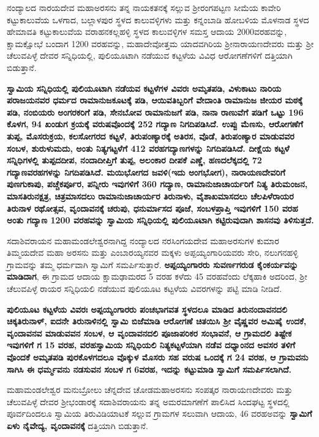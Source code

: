 ನಂದ್ಯಾಲದ ನಾರಯದೇವ ಮಹಾಅರಸನು ತನ್ನ ನಾಯಕತನಕ್ಕೆ ಸಲ್ಲುವ ಶ‍್ರೀರಂಗಪಟ್ಟಣ ಸೀಮೆಯ ಕಾವೇರಿ ಕಟ್ಟುಕಾಲುವೆಯ ಒಳಗಾದ, ಬಲ್ಲಾಳಪುರ ಸ್ಥಳದ ಕಾಲುವಳ್ಳಿಗಳು ಮತ್ತು ಕನ್ನಂಬಾಡಿ ಹೋಬಳಿಯ ಮೊಳನಾಡ ಸ್ಥಳದ ಹೇಮಾವತಿ ಕಟ್ಟುಕಾಲುವೆಯ ವರಾಹನಕಲ್ಲಹಳ್ಳಿ ಸ್ಥಳದ ಕಾಲುವಳ್ಳಿಗಳ ಸಮಸ್ತ ಆದಾಯ 2000ವರಹವನ್ನು, ಕ್ಷಾಮಕ್ಷೋಭೆ ಬಂದಾಗ 1200 ವರಹವನ್ನು, ಮಹಾದೇವೋತ್ತಮ ಯಾದವಗಿರಿಯ ಶ‍್ರೀನಾರಾಯಣದೇವರು ಮತ್ತು ಶ‍್ರೀ ಚೆಲುವಪಿಳ್ಳೆ ದೇವರ ಸನ್ನಿಧಿಯಲ್ಲಿ, ಪುಲಿಯೂಟಾಗಿ ನಡೆಯುವ ಕಟ್ಟಳೆಯ ವಿವಿಧ ಆರೋಗಣೆಗಳಿಗೆ ದತ್ತಿಯಾಗಿ ಬಿಡುತ್ತಾನೆ.

\textbf{ಸ್ವಾಮಿಯ ಸನ್ನಿಧಿಯಲ್ಲಿ ಪುಲಿಯೂಟಾಗಿ ನಡೆಯವ ಕಟ್ಟಳೆಗಳ ವಿವರಃ ಅಮೃತಪಡಿ, ವಿಳುಕಾಟು ನಾರಿಯ ಪರಾಜಯನವರ ಧರ್ಮದ ರಾಮಾನುಜಕೂಟಕ್ಕೆ ಪಡಿ, ಆಯಿವತಿಬ್ಬರಿಗೆ ವೇದಾಂತಿ ರಾಮಾನುಜ ಜೀಯರ ಮಠಕ್ಕೆ ಪಡಿ, ನಂಬಿಯರು ಅಂಗರಕರಿಗೆ ಪಡಿ, ಸೇನಬೋವ ರಾಮಾನುಜಗೆ ಪಡಿ, ನಾನಾ ರಾಣುವೆಗೆ ಪಡಿಗೆ ಒಟ್ಟು 196 ಕೊಳಗ, 94 ಖಂಡುಗ ಕ್ರಯಕ್ಕೆ ವರುಷವೊಂದಕ್ಕೆ 252 ಗದ್ಯಾಣ ನಿಗದಿಪಡಿಸಿದೆ. ಉಪ್ಪು ಮೆಣಸು, ಆರೋಗಣೆಗೆ ತುಪ್ಪ, ಮೊಸರುಕ್ರಯ, ಕಲಸೋಗರದ ಕಟ್ಟಳೆ, ತಿರುಪಂಣ್ಯಾರಕ್ಕೆ ಅತಿರಸ, ವೊಡೆ, ತಿರುಪಂಣ್ಯಾರ ಮಾಡುವವರ ಸಂಬಳ, ಶುರುಳುಮದು, ಅಂತು ನಿತ್ಯಗಟ್ಟಳೆಗೆ 412 ವರಹಗದ್ಯಾಣಗಳನ್ನು ನಿಗದಿಪಡಿಸಿದೆ. ದೀಕ್ಷೆಯ ಕಟ್ಟಳೆ ಸನ್ನಿಧಿಗಳಲ್ಲಿ ತುಪ್ಪದದೀಪ, ನಂದಾದೀಪ್ತಿಗೆ ತುಪ್ಪ, ಅಲಂಕಾರ ದೀಪಕೆ ಎಣ್ಣೆ, ಹಣದಲೆಕ್ಕದಲ್ಲಿ 72 ಗದ್ಯಾಣವರಹಗಳನ್ನು ನಿಗದಿಪಡಿಸಿದೆ. ಮಯಿಭೋಗದ ಜವಳಿ(ಇದು ಅಂಗಭೋಗ), ನಾರಾಯಣದೇವರಿಗೆ ಪುಣಗುಕಾಪು, ಪಚ್ಚೆಕರ್ಪೂರ, ಪನ್ನೀರು ಇವುಗಳಿಗೆ 360 ಗದ್ಯಾಣ, ರಾಮಾನುಜಾಚಾರ್ಯರಿಗೆ ನಿತ್ಯ ತಿರುಮಂಜನ, ಮಾಸತಿರುನಕ್ಷತ್ರ, ಚಿತ್ರಮಾಸದಲು ರಾಮಾನುಜಾಚಾರ್ಯರ ತಿರುನಾಳು, ವೈಶಾಖಮಾಸದಲು ಚೆಲಪಿಳೆರಾಯರ ತಿರುನಾಳ ರಥೋತ್ಸವ, ವೃಂದಾವನಕ್ಕೆ ಚರುಪು, ಧನುರ್ಮಾಸದ ಪೂಜೆ, ಸಂಬಳಪ್ರಾಪ್ತಿ ಇವುಗಳಿಗೆ 150 ವರಹ ಅಂತು ಗದ್ಯಾಣ 1200 ವರಹವನ್ನು ಸ್ವಾಮಿಯ ಸನ್ನಿಧಿಯಲ್ಲಿ ಪುಲಿಯೂಟಾಗಿ ಕಟ್ಟಿರುವುದಾಗಿ ಶಾಸನವು ತಿಳಿಸುತ್ತದೆ.}

ಸದಾಶಿವರಾಯನ ಮಹಾಮಂಡಲೇಶ್ವರನಾಗಿದ್ದ ನಂದ್ಯಾಲದ ನರಸಿಂಗಯದೇವ ಮಹಾಅರಸುಗಳ ಕುಮಾರ ತಿಮ್ಮಯದೇವ ಮಹಾ ಅರಸನು ಮತ್ತು ಎಂಬಾರಯ್ಯನವರ ಮಕ್ಕಳು ಅಪ್ಪಯ್ಯಂಗಾರಿಯವರು ಸೇರಿ, ನಲುಗನಹಳ್ಳಿ ಗ್ರಾಮವನ್ನು ತಮ್ಮ ಧರ್ಮವಾಗಿ ಸ್ವಾಮಿಗೆ ಸಮರ್ಪಿಸುತ್ತಾರೆ. \textbf{ಅಪ್ಪಯ್ಯಂಗಾರರು ಸುವರ್ಣಗರುಡ ಕೈಂಕರ್ಯವನ್ನು ಮಾಡಿದಾಗ}, ಈ ಗ್ರಾಮದ ಆದಾಯ ಕ್ಷಾಮಢಾಮರದ 5 ವರಹ ಕಳೆದು 45 ವರಹವೆಂದು ಲೆಕ್ಕಹಾಕಿ ಅದರಿಂದ, ಶ‍್ರೀ ಚೆಲುವಪಿಳ್ಳೆ ರಾಯರ ಸನ್ನಿಧಿಯಲಿ ನಡೆಯುವ ಪುಲಿಯೂಟ ಕಟ್ಟಳೆಯ ವಿವರಗಳನ್ನು ಪಟ್ಟಿ ಮಾಡಿ ನೀಡಿದೆ.

\textbf{ಪುಲಿಯೂಟ ಕಟ್ಟಳೆಯ ವಿವರಃ ಅಪ್ಪಯ್ಯಂಗಾರರು ಪಂಚಭಾಗವತ ಸ್ಥಳದಲೂ ಮಾಡಿದ ತಿರುನಂದಾವನದಲಿ ಚಿಕ್ಕತಿರುನಾಳ್​, ಐದನೇ ತಿರುನಾಳಿನಲ್ಲಿ ಸ್ವಾಮಿ ಬಿಜೆಮಾಡಿ ಆರೋಗಣೆ ಚಿತಯಿಸಿ ಶ‍್ರೀ ವೈಷ್ಣವರ ಅಮಿಷೈ ಉದಕೆ, ವೃಂದಾವನವ ಮಾಡುವವನ ಸಂಬಳ, ಆ ವೃಂದಾವನದಲಿ ಪೂಜಾಪರಿಕರ ಸಂಭಾವನೆ, ಆ ಗ್ರಾಮದಲಿ ತಿಷ್ಟೇಕ ಇವುಗಳಿಗೆ ಗ 15 ವರಹ, ವರಹಸ್ವಾಮಿಯ ಸನ್ನಿಧಿಯಲಿ ನಿತ್ಯಕಟ್ಟಳೆಯಾಗಿ ನಡೆವ ದಧ್ಯಾಂನದ ಅವಸರ ತಳಿಗೆ ವೊಂದಕೆ ಅಮೃತಪಡಿ ಪುರಕೊಳಗದಲೂ ವೊಕ್ಕುಳ ಮೊಸರು ಸಹ ವರುಷ ಒಂದಕ್ಕೆ ಗ 24 ವರಹ, ಆ ಗ್ರಾಮವನು ಸಾಗಿಸಿ ಈ ಧರ್ಮ್ಮವನು ನಡಸುವನ ಸಂಬಳ ಗ 6ವರಹ, ಇದನ್ನು ಕಟ್ಟುಮಾಡಿ ಸ್ವಾಮಿಗೆ ಸಮರ್ಪಿಸಲಾಗಿದೆ.}

ಮಹಾಮಂಡಲೇಶ್ವರ ಮನುಬ್ರೋಲು ಚೆನ್ನದೇವ ಚೋಡಮಹಾಅರಸನು ಸಂಪತ್ಕರ ನಾರಾಯಣದೇವರು ಮತ್ತು ಚೆಲುವಪಿಳ್ಳೆ ದೇವರ ಶ‍್ರೀಭಂಡಾರಕ್ಕೆ ಸದಾಶಿವರಾಯನು ತನ್ನ ಅಮರಮಾಗಣೆಗೆ ಪಾಲಿಸಿದ ಸಿಂದಘಟ್ಟ ಸ್ಥಳದಲ್ಲಿ ಪೂರ್ವದಿಂದಲೂ ಸ್ವಾಮಿಯ ತಿರುವಿಡಿಯಾಟಕೆ ಸಲ್ಲುವ ಗ್ರಾಮಗಳ ಸಲುವಾಗಿ ಆದಾಯ, 46 ವರಹಅವನ್ನು \textbf{ಸ್ವಾಮಿಗೆ ಏಳು ನೈವೇದ್ಯ, ವೃಂದಾವನಕ್ಕೆ} ದತ್ತಿಯಾಗಿ ಬಿಡುತ್ತಾನೆ.

